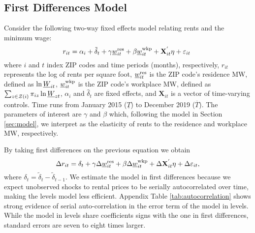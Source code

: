     
\subsection{First Differences Model}

Consider the following two-way fixed effects model relating rents and the 
minimum wage:
\begin{equation*} \label{eq:did_lev}
    r_{it} = \alpha_i + \tilde{\delta}_t 
           + \gamma \underline{w}^{\text{res}}_{it} + \beta \underline{w}^{\text{wkp}}_{it}
           + \mathbf{X}^{'}_{it}\eta
           + \varepsilon_{it} \ 
\end{equation*}    
where
$i$ and $t$ index ZIP codes and time periods (months), respectively,
$r_{it}$ represents the log of rents per square foot,
$\underline{w}^{\text{res}}_{it}$ is the ZIP code's residence MW, defined as 
$\ln \underline{W}_{it}$,
$\underline{w}^{\text{wkp}}_{it}$ is the ZIP code's workplace MW, defined as 
$\sum_{z\in\mathcal{Z}(i)} \pi_{iz}\ln \underline{W}_{zt}$,
$\alpha_i$ and $\hat{\delta}_t$ are fixed effects, and 
$\mathbf{X}_{it}$ is a vector of time-varying controls.
Time runs from January 2015 ($\underline{T}$) to December 2019 ($\overline{T}$).
The parameters of interest are $\gamma$ and $\beta$ which, 
following the model in Section \ref{sec:model}, 
we interpret as the elasticity of rents to the residence and workplace MW, 
respectively.

By taking first differences on the previous equation we obtain
\begin{equation}\label{eq:fd}
    \Delta r_{it} = \delta_t
                  + \gamma \Delta \underline{w}^{\text{res}}_{it} + \beta \Delta \underline{w}^{\text{wkp}}_{it}
                  + \Delta \mathbf{X}^{'}_{it}\eta
                  + \Delta \varepsilon_{it} ,
\end{equation}
where $\delta_t = \tilde{\delta}_t - \tilde{\delta}_{t-1}$.
We estimate the model in first differences because we expect unobserved shocks
to rental prices to be serially autocorrelated over time, making the levels
model less efficient.
Appendix Table \ref{tab:autocorrelation} shows strong evidence of serial 
auto-correlation in the error term of the model in levels.
While the model in levels share coefficients signs with the one in first 
differences, standard errors are seven to eight times larger.

